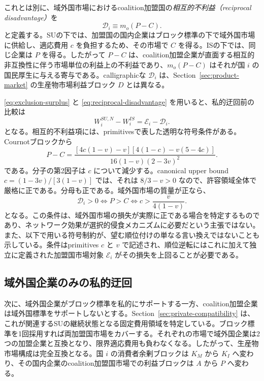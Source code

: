 これとは別に、域外国市場におけるcoalition加盟国の\emph{相互的不利益（reciprocal disadvantage）}を
\begin{equation}
    \mathscr D_i
    \equiv
    m_o(P-C).
    \label{eq:reciprocal-disadvantage}
\end{equation}
と定義する。SUの下では、加盟国の国内企業はブロック標準の下で域外国市場に供給し、適応費用 $c$ を負担するため、その市場で $C$ を得る。ISの下では、同じ企業は $P$ を得る。したがって $P-C$ は、coalition加盟企業が直面する相互的非互換性に伴う市場単位の利益上の不利益であり、$m_o(P-C)$ はそれが国 $i$ の国民厚生に与える寄与である。calligraphicな $\mathscr D_i$ は、Section~\ref{sec:product-market} の生産物市場利益ブロック $D$ とは異なる。

\eqref{eq:exclusion-surplus} と \eqref{eq:reciprocal-disadvantage} を用いると、私的迂回前の比較は
\begin{equation}
    \boxed{
    W_i^{SU,N}-W_i^{IS}
    =\mathscr E_i-\mathscr D_i.
    }
    \label{eq:selective-before}
\end{equation}
となる。相互的不利益項には、primitivesで表した透明な符号条件がある。Cournotブロックから
\begin{equation}
    P-C
    =
    \frac{
    [4c(1-v)-v]
    [4(1-c)-v(5-4c)]
    }{
    16(1-v)(2-3v)^2
    }.
    \label{eq:p-minus-c-factorization}
\end{equation}
である。分子の第2因子は $c$ について減少する。canonical upper bound $c=(1-3v)/[3(1-v)]$ では、それは $8/3-v>0$ なので、許容領域全体で厳格に正である。分母も正である。域外国市場の質量が正なら、
\begin{equation}
    \boxed{
    \mathscr D_i>0
    \iff
    P>C
    \iff
    c>\frac{v}{4(1-v)}.
    }
    \label{eq:reciprocal-disadvantage-condition}
\end{equation}
となる。この条件は、域外国市場の損失が実際に正である場合を特定するものであり、ネットワーク効果が選択的侵食メカニズムに必要だという主張ではない。また、以下で用いる符号制約が、望む順位付けの単なる言い換えではないことも示している。条件はprimitives $c$ と $v$ で記述され、順位逆転にはこれに加えて独立に定義された加盟国市場対象 $\mathscr E_i$ がその損失を上回ることが必要である。

\subsection{域外国企業のみの私的迂回}
\label{subsec:selective-outsider-bypass}

次に、域外国企業がブロック標準を私的にサポートする一方、coalition加盟企業は域外国標準をサポートしないとする。Section~\ref{sec:private-compatibility} は、これが関連するSUの継続状態となる固定費用領域を特定している。ブロック標準を1回採用すれば両加盟国市場をカバーする。それぞれの市場で域外国企業は2つの加盟企業と互換となり、限界適応費用も負わなくなる。したがって、生産物市場構成は完全互換となる。国 $i$ の消費者余剰ブロックは $K_M$ から $K_I$ へ変わり、その国内企業のcoalition加盟国市場での利益ブロックは $A$ から $P$ へ変わる。

